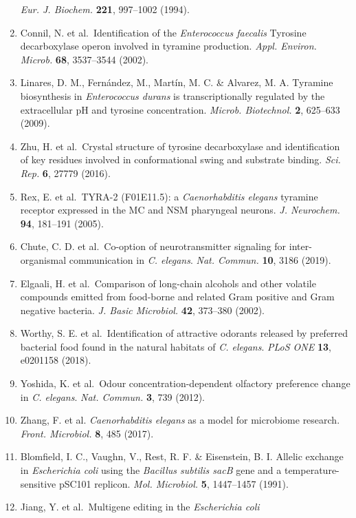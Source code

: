 \documentclass[11pt,]{article}
\begin{document}
\begin{enumerate}
  \emph{Eur. J. Biochem.} \textbf{221}, 997--1002 (1994).
\item
  Connil, N. et al.~Identification of the \emph{Enterococcus faecalis}
  Tyrosine decarboxylase operon involved in tyramine production.
  \emph{Appl. Environ. Microb.} \textbf{68}, 3537--3544 (2002).
\item
  Linares, D. M., Fernández, M., Martín, M. C. \& Alvarez, M. A.
  Tyramine biosynthesis in \emph{Enterococcus durans} is
  transcriptionally regulated by the extracellular pH and tyrosine
  concentration. \emph{Microb. Biotechnol.} \textbf{2}, 625--633 (2009).
\item
  Zhu, H. et al.~Crystal structure of tyrosine decarboxylase and
  identification of key residues involved in conformational swing and
  substrate binding. \emph{Sci. Rep.} \textbf{6}, 27779 (2016).
\item
  Rex, E. et al.~TYRA-2 (F01E11.5): a \emph{Caenorhabditis elegans}
  tyramine receptor expressed in the MC and NSM pharyngeal neurons.
  \emph{J. Neurochem.} \textbf{94}, 181--191 (2005).
\item
  Chute, C. D. et al.~Co-option of neurotransmitter signaling for
  inter-organismal communication in \emph{C. elegans}. \emph{Nat.
  Commun.} \textbf{10}, 3186 (2019).
\item
  Elgaali, H. et al.~Comparison of long-chain alcohols and other
  volatile compounds emitted from food-borne and related Gram positive
  and Gram negative bacteria. \emph{J. Basic Microbiol.} \textbf{42},
  373--380 (2002).
\item
  Worthy, S. E. et al.~Identification of attractive odorants released by
  preferred bacterial food found in the natural habitats of \emph{C.
  elegans}. \emph{PLoS ONE} \textbf{13}, e0201158 (2018).
\item
  Yoshida, K. et al.~Odour concentration-dependent olfactory preference
  change in \emph{C. elegans}. \emph{Nat. Commun.} \textbf{3}, 739
  (2012).
\item
  Zhang, F. et al. \emph{Caenorhabditis elegans} as a model for
  microbiome research. \emph{Front. Microbiol.} \textbf{8}, 485 (2017).
\item
  Blomfield, I. C., Vaughn, V., Rest, R. F. \& Eisenstein, B. I. Allelic
  exchange in \emph{Escherichia coli} using the \emph{Bacillus subtilis
  sacB} gene and a temperature-sensitive pSC101 replicon. \emph{Mol.
  Microbiol.} \textbf{5}, 1447--1457 (1991).
\item
  Jiang, Y. et al.~Multigene editing in the \emph{Escherichia coli}

\end{enumerate}
\end{document}
